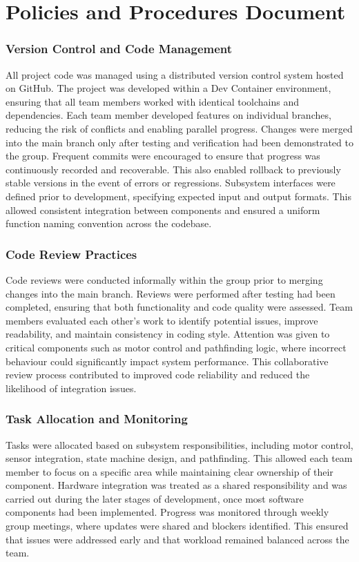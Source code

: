 \documentclass[a4paper,11pt]{report}
\author{Andrew Smith \\ Lewis Alexander \\ Preben Rasamanickam \\ Kyle Hannah}
\begin{document}
\maketitle
\chapter{Policies and Procedures Document}

\subsection{Version Control and Code Management}
All project code was managed using a distributed version control system hosted on GitHub. The project was developed within a Dev Container environment, ensuring that all team members worked with identical toolchains and dependencies.
Each team member developed features on individual branches, reducing the risk of conflicts and enabling parallel progress. Changes were merged into the main branch only after testing and verification had been demonstrated to the group.
Frequent commits were encouraged to ensure that progress was continuously recorded and recoverable. This also enabled rollback to previously stable versions in the event of errors or regressions.
Subsystem interfaces were defined prior to development, specifying expected input and output formats. This allowed consistent integration between components and ensured a uniform function naming convention across the codebase.

\subsection{Code Review Practices}
Code reviews were conducted informally within the group prior to merging changes into the main branch. Reviews were performed after testing had been completed, ensuring that both functionality and code quality were assessed.
Team members evaluated each other’s work to identify potential issues, improve readability, and maintain consistency in coding style. Attention was given to critical components such as motor control and pathfinding logic, where incorrect behaviour could significantly impact system performance.
This collaborative review process contributed to improved code reliability and reduced the likelihood of integration issues.

\subsection{Task Allocation and Monitoring}
Tasks were allocated based on subsystem responsibilities, including motor control, sensor integration, state machine design, and pathfinding. This allowed each team member to focus on a specific area while maintaining clear ownership of their component.
Hardware integration was treated as a shared responsibility and was carried out during the later stages of development, once most software components had been implemented.
Progress was monitored through weekly group meetings, where updates were shared and blockers identified. This ensured that issues were addressed early and that workload remained balanced across the team.
\end{document}
